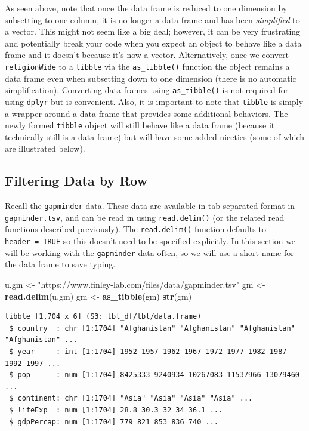 \documentclass[
]{krantz}
\makeatletter
\newenvironment{Shaded}{\begin{snugshade}}{\end{snugshade}}
\newcommand{\KeywordTok}[1]{\textcolor[rgb]{0.27,0.27,0.27}{\textbf{#1}}}
\newcommand{\NormalTok}[1]{#1}
\newcommand{\StringTok}[1]{\textcolor[rgb]{0.5,0.5,0.5}{#1}}
\newenvironment{kframe}{%
\medskip{}
\setlength{\fboxsep}{.8em}
 \def\at@end@of@kframe{}%
 \ifinner\ifhmode%
  \def\at@end@of@kframe{\end{minipage}}%
  \begin{minipage}{\columnwidth}%
 \fi\fi%
 \def\FrameCommand##1{\hskip\@totalleftmargin \hskip-\fboxsep
 \colorbox{shadecolor}{##1}\hskip-\fboxsep
     \hskip-\linewidth \hskip-\@totalleftmargin \hskip\columnwidth}%
 \MakeFramed {\advance\hsize-\width
   \@totalleftmargin\z@ \linewidth\hsize
   \@setminipage}}%
 {\par\unskip\endMakeFramed%
 \at@end@of@kframe}
\renewenvironment{Shaded}{\begin{kframe}}{\end{kframe}}
\makeatother
\begin{document}
As seen above, note that once the data frame is reduced to one dimension by subsetting to one column, it is no longer a data frame and has been \emph{simplified} to a vector. This might not seem like a big deal; however, it can be very frustrating and potentially break your code when you expect an object to behave like a data frame and it doesn't because it's now a vector. Alternatively, once we convert \texttt{religionWide} to a \texttt{tibble} via the \texttt{as\_tibble()} function the object remains a data frame even when subsetting down to one dimension (there is no automatic simplification). Converting data frames using \texttt{as\_tibble()} is not required for using \texttt{dplyr} but is convenient. Also, it is important to note that \texttt{tibble} is simply a wrapper around a data frame that provides some additional behaviors. The newly formed \texttt{tibble} object will still behave like a data frame (because it technically still is a data frame) but will have some added niceties (some of which are illustrated below).

\hypertarget{filtering-data-by-row}{%
\subsection{Filtering Data by Row}\label{filtering-data-by-row}}

Recall the \texttt{gapminder} data. These data are available in tab-separated format in \texttt{gapminder.tsv}, and can be read in using \texttt{read.delim()} (or the related read functions described previously). The \texttt{read.delim()} function defaults to \texttt{header\ =\ TRUE} so this doesn't need to be specified explicitly. In this section we will be working with the \texttt{gapminder} data often, so we will use a short name for the data frame to save typing.

\begin{Shaded}
\begin{Highlighting}[]
\NormalTok{u.gm \textless{}{-}}\StringTok{ "https://www.finley{-}lab.com/files/data/gapminder.tsv"}
\NormalTok{gm \textless{}{-}}\StringTok{ }\KeywordTok{read.delim}\NormalTok{(u.gm)}
\NormalTok{gm \textless{}{-}}\StringTok{ }\KeywordTok{as\_tibble}\NormalTok{(gm)}
\KeywordTok{str}\NormalTok{(gm)}
\end{Highlighting}
\end{Shaded}

\begin{verbatim}
tibble [1,704 x 6] (S3: tbl_df/tbl/data.frame)
 $ country  : chr [1:1704] "Afghanistan" "Afghanistan" "Afghanistan" "Afghanistan" ...
 $ year     : int [1:1704] 1952 1957 1962 1967 1972 1977 1982 1987 1992 1997 ...
 $ pop      : num [1:1704] 8425333 9240934 10267083 11537966 13079460 ...
 $ continent: chr [1:1704] "Asia" "Asia" "Asia" "Asia" ...
 $ lifeExp  : num [1:1704] 28.8 30.3 32 34 36.1 ...
 $ gdpPercap: num [1:1704] 779 821 853 836 740 ...
\end{verbatim}
\end{document}
